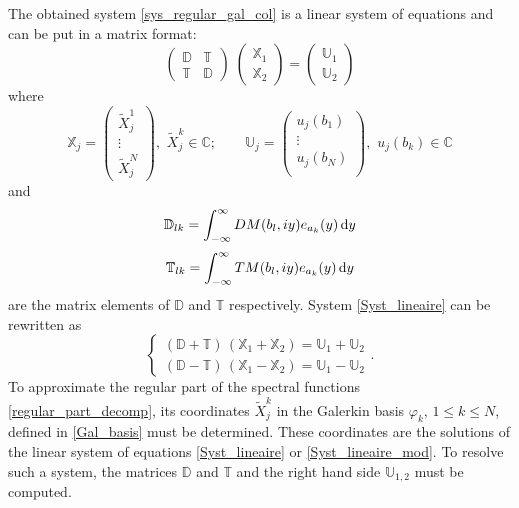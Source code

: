 The obtained system \eqref{sys_regular_gal_col} is a linear system of equations and can be put in a matrix format:
\begin{equation}
\label{Syst_lineaire}
\begin{pmatrix}
\mathbb{D} & \mathbb{T}\\
\mathbb{T} & \mathbb{D}
\end{pmatrix}
\;
\begin{pmatrix}
\mathbb{X}_1\\
\mathbb{X}_2
\end{pmatrix}
 = 
\begin{pmatrix}
\mathbb{U}_1\\
\mathbb{U}_2
\end{pmatrix}
\end{equation}
where
\begin{equation}
\mathbb{X}_j = 
\begin{pmatrix}
\tilde{X}_j^1 \\
\vdots \\
\tilde{X}_j^N
\end{pmatrix},
\, \, \tilde{X}_j^k \in \mathbb{C}; \qquad
\mathbb{U}_j = 
\begin{pmatrix}
u_j(b_1)\\
\vdots\\
u_j(b_N)\\
\end{pmatrix},
\, \, u_j(b_k) \in \mathbb{C}
\end{equation} 
and 
\begin{equation}
\label{D_matrix}
\mathbb{D}_{lk} = \int_{-\infty}^\infty DM(b_l,iy) e_{a_k}(y) \, {\rm d} y
\end{equation}
\begin{equation}
\label{T_matrix}
\mathbb{T}_{lk} = \int_{-\infty}^\infty TM(b_l,iy) e_{a_k}(y) \, {\rm d} y
\end{equation}
are the matrix elements of $\mathbb{D}$ and $\mathbb{T}$ respectively. System \eqref{Syst_lineaire} can be rewritten as
\begin{equation}
\label{Syst_lineaire_mod}
\begin{cases}
(\mathbb{D} + \mathbb{T}) \, (\mathbb{X}_1 + \mathbb{X}_2) = \mathbb{U}_1 +  \mathbb{U}_2\\
(\mathbb{D} - \mathbb{T}) \, (\mathbb{X}_1 - \mathbb{X}_2) = \mathbb{U}_1 - \mathbb{U}_2
\end{cases}.
\end{equation}
To approximate the regular part of the spectral functions \eqref{regular_part_decomp}, its coordinates $\tilde{X}_j^k$ in the Galerkin basis $\varphi_k, \, 1 \leq k \leq N$, defined in \eqref{Gal_basis} must be determined. These coordinates are the solutions of the linear system of equations \eqref{Syst_lineaire} or \eqref{Syst_lineaire_mod}. To resolve such a system, the matrices $\mathbb{D}$ and $\mathbb{T}$ and the right hand side $\mathbb{U}_{1,2}$ must be computed. 

